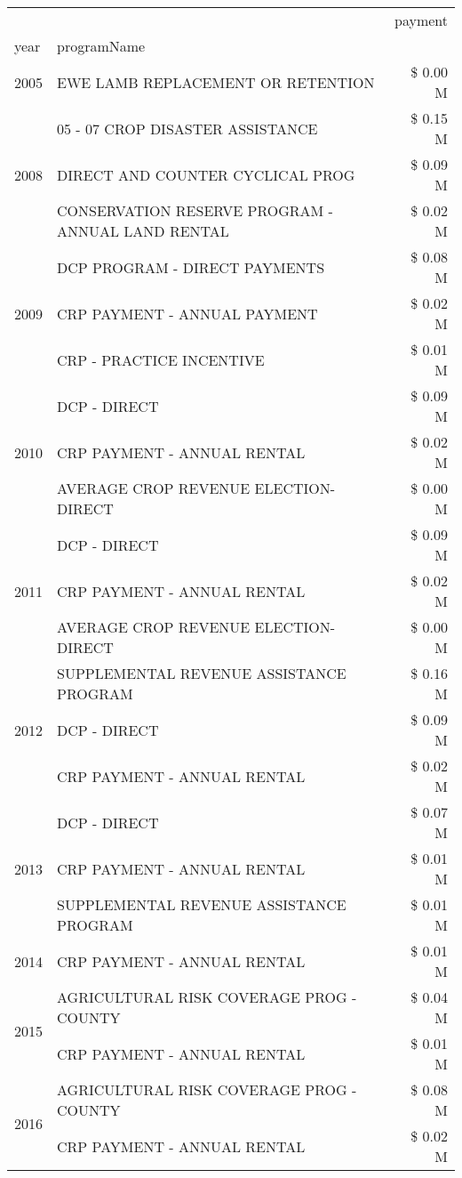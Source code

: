 \begin{tabular}{llr}
\toprule
 &  & payment \\
year & programName &  \\
\midrule
2005 & EWE LAMB REPLACEMENT OR RETENTION & \$ 0.00 M \\
\cline{1-3}
\multirow[t]{3}{*}{2008} & 05 - 07 CROP DISASTER ASSISTANCE & \$ 0.15 M \\
 & DIRECT AND COUNTER CYCLICAL PROG & \$ 0.09 M \\
 & CONSERVATION RESERVE PROGRAM - ANNUAL LAND RENTAL & \$ 0.02 M \\
\cline{1-3}
\multirow[t]{3}{*}{2009} & DCP PROGRAM - DIRECT PAYMENTS & \$ 0.08 M \\
 & CRP PAYMENT - ANNUAL PAYMENT & \$ 0.02 M \\
 & CRP - PRACTICE INCENTIVE & \$ 0.01 M \\
\cline{1-3}
\multirow[t]{3}{*}{2010} & DCP - DIRECT & \$ 0.09 M \\
 & CRP PAYMENT - ANNUAL RENTAL & \$ 0.02 M \\
 & AVERAGE CROP REVENUE ELECTION-DIRECT & \$ 0.00 M \\
\cline{1-3}
\multirow[t]{3}{*}{2011} & DCP - DIRECT & \$ 0.09 M \\
 & CRP PAYMENT - ANNUAL RENTAL & \$ 0.02 M \\
 & AVERAGE CROP REVENUE ELECTION-DIRECT & \$ 0.00 M \\
\cline{1-3}
\multirow[t]{3}{*}{2012} & SUPPLEMENTAL REVENUE ASSISTANCE PROGRAM & \$ 0.16 M \\
 & DCP - DIRECT & \$ 0.09 M \\
 & CRP PAYMENT - ANNUAL RENTAL & \$ 0.02 M \\
\cline{1-3}
\multirow[t]{3}{*}{2013} & DCP - DIRECT & \$ 0.07 M \\
 & CRP PAYMENT - ANNUAL RENTAL & \$ 0.01 M \\
 & SUPPLEMENTAL REVENUE ASSISTANCE PROGRAM & \$ 0.01 M \\
\cline{1-3}
2014 & CRP PAYMENT - ANNUAL RENTAL & \$ 0.01 M \\
\cline{1-3}
\multirow[t]{2}{*}{2015} & AGRICULTURAL RISK COVERAGE PROG - COUNTY & \$ 0.04 M \\
 & CRP PAYMENT - ANNUAL RENTAL & \$ 0.01 M \\
\cline{1-3}
\multirow[t]{3}{*}{2016} & AGRICULTURAL RISK COVERAGE PROG - COUNTY & \$ 0.08 M \\
 & CRP PAYMENT - ANNUAL RENTAL & \$ 0.02 M \\

\end{tabular}
